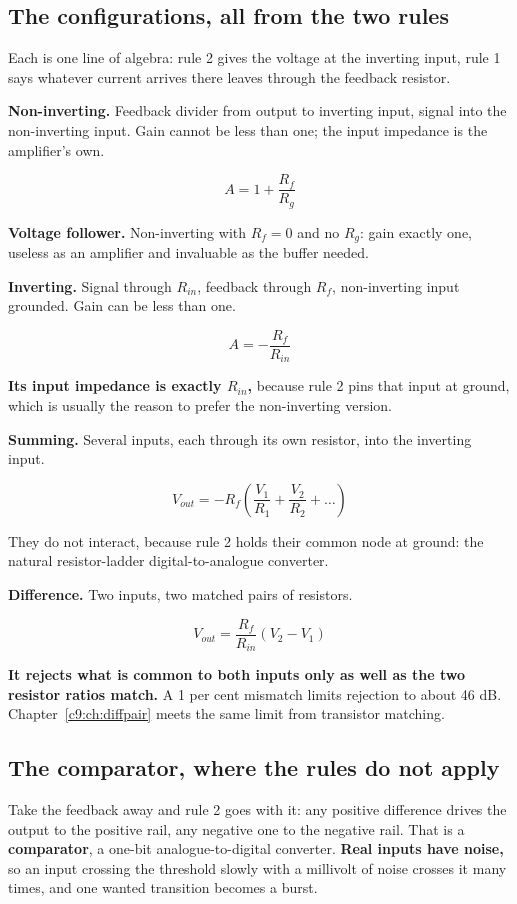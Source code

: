 \subsection{The configurations, all from the two rules}
\label{c3:sec:b3}
Each is one line of algebra: rule 2 gives the voltage at the inverting input, rule 1 says whatever current arrives there leaves through the feedback resistor.

\textbf{Non-inverting.} Feedback divider from output to inverting input, signal into the non-inverting input. Gain cannot be less than one; the input impedance is the amplifier's own.

\[
  A = 1 + \frac{R_f}{R_g}
\]

\textbf{Voltage follower.} Non-inverting with $R_f = 0$ and no $R_g$: gain exactly one, useless as an amplifier and invaluable as the buffer  needed.

\textbf{Inverting.} Signal through $R_{in}$, feedback through $R_f$, non-inverting input grounded. Gain can be less than one.

\[
  A = -\frac{R_f}{R_{in}}
\]

\textbf{Its input impedance is exactly $R_{in}$,} because rule 2 pins that input at ground, which is usually the reason to prefer the non-inverting version.

\textbf{Summing.} Several inputs, each through its own resistor, into the inverting input.

\[
  V_{out} = -R_f \left( \frac{V_1}{R_1} + \frac{V_2}{R_2} + \dots \right)
\]

They do not interact, because rule 2 holds their common node at ground: the natural resistor-ladder digital-to-analogue converter.

\textbf{Difference.} Two inputs, two matched pairs of resistors.

\[
  V_{out} = \frac{R_f}{R_{in}} (V_2 - V_1)
\]

\textbf{It rejects what is common to both inputs only as well as the two resistor ratios match.} A 1 per cent mismatch limits rejection to about 46 dB. Chapter~\ref{c9:ch:diffpair} meets the same limit from transistor matching.

\subsection{The comparator, where the rules do not apply}
\label{c3:sec:b4}
Take the feedback away and rule 2 goes with it: any positive difference drives the output to the positive rail, any negative one to the negative rail. That is a \textbf{comparator}, a one-bit analogue-to-digital converter. \textbf{Real inputs have noise,} so an input crossing the threshold slowly with a millivolt of noise crosses it many times, and one wanted transition becomes a burst.

